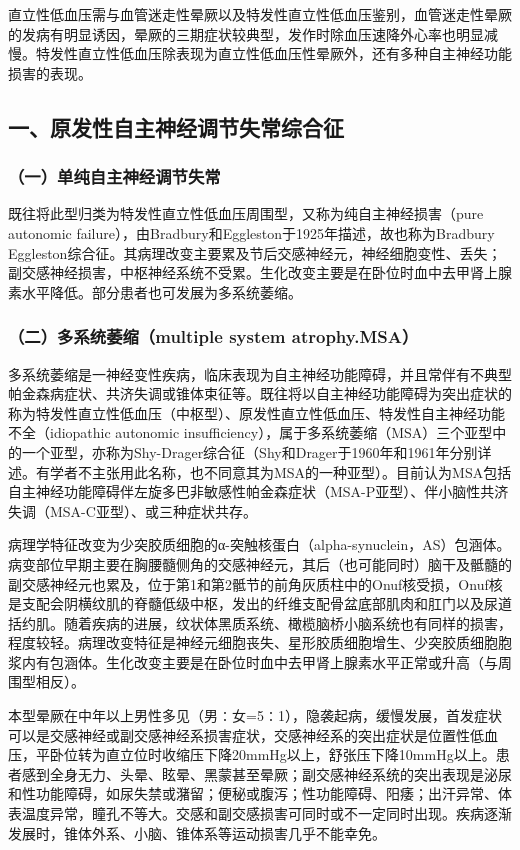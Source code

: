 直立性低血压需与血管迷走性晕厥以及特发性直立性低血压鉴别，血管迷走性晕厥的发病有明显诱因，晕厥的三期症状较典型，发作时除血压速降外心率也明显减慢。特发性直立性低血压除表现为直立性低血压性晕厥外，还有多种自主神经功能损害的表现。

\subsection{一、原发性自主神经调节失常综合征}

\subsubsection{（一）单纯自主神经调节失常}

既往将此型归类为特发性直立性低血压周围型，又称为纯自主神经损害（pure
autonomic failure），由Bradbury和Eggleston于1925年描述，故也称为Bradbury
Eggleston综合征。其病理改变主要累及节后交感神经元，神经细胞变性、丢失；副交感神经损害，中枢神经系统不受累。生化改变主要是在卧位时血中去甲肾上腺素水平降低。部分患者也可发展为多系统萎缩。

\subsubsection{（二）多系统萎缩（multiple system atrophy.MSA）}

多系统萎缩是一神经变性疾病，临床表现为自主神经功能障碍，并且常伴有不典型帕金森病症状、共济失调或锥体束征等。既往将以自主神经功能障碍为突出症状的称为特发性直立性低血压（中枢型）、原发性直立性低血压、特发性自主神经功能不全（idiopathic
autonomic
insufficiency），属于多系统萎缩（MSA）三个亚型中的一个亚型，亦称为Shy-Drager综合征（Shy和Drager于1960年和1961年分别详述。有学者不主张用此名称，也不同意其为MSA的一种亚型）。目前认为MSA包括自主神经功能障碍伴左旋多巴非敏感性帕金森症状（MSA-P亚型）、伴小脑性共济失调（MSA-C亚型）、或三种症状共存。

病理学特征改变为少突胶质细胞的α-突触核蛋白（alpha-synuclein，AS）包涵体。病变部位早期主要在胸腰髓侧角的交感神经元，其后（也可能同时）脑干及骶髓的副交感神经元也累及，位于第1和第2骶节的前角灰质柱中的Onuf核受损，Onuf核是支配会阴横纹肌的脊髓低级中枢，发出的纤维支配骨盆底部肌肉和肛门以及尿道括约肌。随着疾病的进展，纹状体黑质系统、橄榄脑桥小脑系统也有同样的损害，程度较轻。病理改变特征是神经元细胞丧失、星形胶质细胞增生、少突胶质细胞胞浆内有包涵体。生化改变主要是在卧位时血中去甲肾上腺素水平正常或升高（与周围型相反）。

本型晕厥在中年以上男性多见（男∶女=5∶1），隐袭起病，缓慢发展，首发症状可以是交感神经或副交感神经系损害症状，交感神经系的突出症状是位置性低血压，平卧位转为直立位时收缩压下降20mmHg以上，舒张压下降10mmHg以上。患者感到全身无力、头晕、眩晕、黑蒙甚至晕厥；副交感神经系统的突出表现是泌尿和性功能障碍，如尿失禁或潴留；便秘或腹泻；性功能障碍、阳痿；出汗异常、体表温度异常，瞳孔不等大。交感和副交感损害可同时或不一定同时出现。疾病逐渐发展时，锥体外系、小脑、锥体系等运动损害几乎不能幸免。

